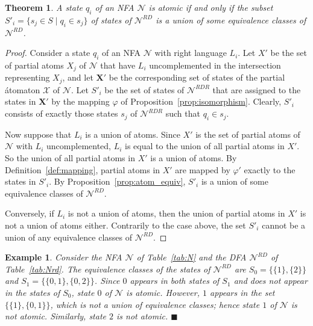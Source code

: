 \documentclass[preprint,12pt]{elsarticle}
\newcommand{\cN}{{\mathcal N}}
\newcommand{\cX}{{\mathcal X}}
\newcommand{\rev}{R}
\newcommand{\deter}{D}
\newcommand{\qedb}{\hfill$\blacksquare$}
\newtheorem{example}{Example}
\newtheorem{theorem}{Theorem}
\begin{document}
\begin{theorem}
\label{thm:atomic_state}
A state $q_i$ of an NFA $\cN$ is atomic if and only if 
the subset $S'_i=\{s_j\in S \mid q_i\in s_j\}$ of states of 
$\cN^{\rev\deter}$ is a union of some equivalence classes of $\cN^{\rev\deter}$.
\end{theorem}
\begin{proof}
Consider a state $q_i$ of an NFA $\cN$ with right language $L_i$.
Let $X'$ be the set of partial atoms $X_j$ of $\cN$ 
that have $L_i$ uncomplemented in the intersection representing $X_j$, and
let ${\mathbf X}'$ be the corresponding set of states of the partial \'atomaton 
$\cX$ of $\cN$.
Let $S'_i$ be the set of states of $\cN^{\rev\deter\rev}$ that are assigned to
the states in ${\mathbf X}'$ by the mapping $\varphi$ of 
Proposition~\ref{prop:isomorphism}. Clearly, $S'_i$ consists of
exactly those states $s_j$ of $\cN^{\rev\deter\rev}$ such that $q_i\in s_j$. 

Now suppose that $L_i$ is a union of atoms.
Since $X'$ is the set of partial atoms of $\cN$ with $L_i$ uncomplemented, 
$L_i$ is equal to the union of all partial atoms in $X'$. 
So the union of all partial atoms in $X'$ is a union of atoms. 
By Definition~\ref{def:mapping}, partial atoms in $X'$ are 
mapped by $\varphi'$ exactly to the states in $S'_i$. 
By Proposition~\ref{prop:atom_equiv},
$S'_i$ is a union of some equivalence classes of $\cN^{\rev\deter}$. 

Conversely, if $L_i$ is not a union of atoms, then the union of 
partial atoms in $X'$ is not a union of atoms either. 
Contrarily to the case above, the set $S'_i$ cannot be a union of 
any equivalence classes of $\cN^{\rev\deter}$. 
\end{proof}

\begin{example}
\label{ex:atomic_state}
Consider the NFA $\cN$ of Table~\ref{tab:N} and the DFA $\cN^{RD}$ of Table~\ref{tab:Nrd}. 
The equivalence classes of the states of $\cN^{RD}$ are 
$S_0=\{ \{1\},\{2\} \} $ and $S_1=\{ \{0,1\},\{0,2\} \}$. 
Since $0$ appears in both states of $S_1$ and does not appear in the states of $S_0$, 
state $0$ of $\cN$ is atomic.
However, $1$ appears in the set $\{ \{1\},\{0,1\} \} $, which is not a union of 
equivalence classes; hence state $1$ of $\cN$ is not atomic. Similarly, state $2$ 
is not atomic.
\qedb
\end{example}
\end{document}
